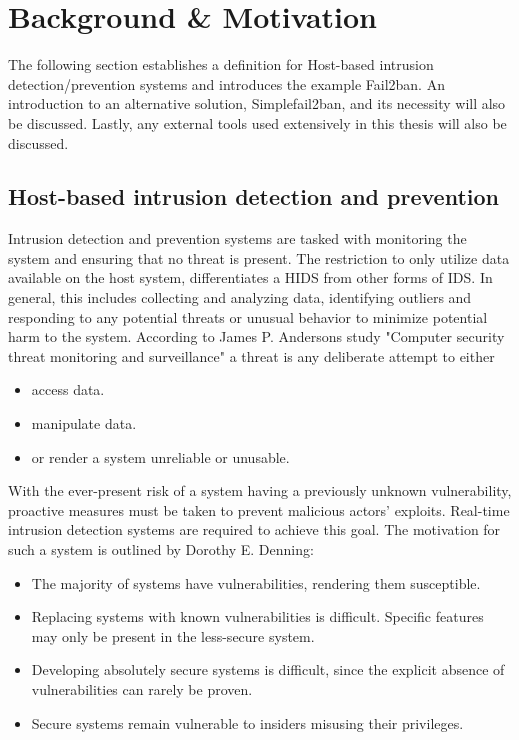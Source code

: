 %
%

\chapter{Background \& Motivation}
\label{cha:background}
The following section establishes a definition for Host-based intrusion detection/prevention systems and introduces the example Fail2ban.
An introduction to an alternative solution, Simplefail2ban, and its necessity will also be discussed.
Lastly, any external tools used extensively in this thesis will also be discussed. 

\section{Host-based intrusion detection and prevention}
Intrusion detection and prevention systems are tasked with monitoring the system and ensuring that no threat is present.
The restriction to only utilize data available on the host system, differentiates a \ac{HIDS} from other forms of \ac{IDS}.
In general, this includes collecting and analyzing data, identifying outliers and responding to any potential threats or unusual behavior to minimize potential harm to the system.
According to James P. Andersons study "Computer security threat monitoring and surveillance"\cite{anderson:compSec} a threat is any deliberate attempt to either
\begin{itemize}
    \itemsep0em
    \item access data.
    \item manipulate data.
    \item or render a system unreliable or unusable.
\end{itemize}

With the ever-present risk of a system having a previously unknown vulnerability, proactive measures must be taken to prevent malicious actors' exploits.
Real-time intrusion detection systems are required to achieve this goal.
The motivation for such a system is outlined by Dorothy E. Denning\cite{denning:IntrusionModel}:
\begin{itemize}
    \itemsep0em
    \item The majority of systems have vulnerabilities, rendering them susceptible. 
    \item Replacing systems with known vulnerabilities is difficult. Specific features may only be present in the less-secure system.
    \item Developing absolutely secure systems is difficult, since the explicit absence of vulnerabilities can rarely be proven.
    \item Secure systems remain vulnerable to insiders misusing their privileges.
\end{itemize}

